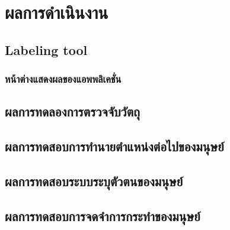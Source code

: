\chapter{ผลการดำเนินงาน}
\section{Labeling tool}
\subsection{หน้าต่างแสดงผลของแอพพลิเคชั่น}


\clearpage
\section{ผลการทดลองการตรวจจับวัตถุ}

\clearpage
\section{ผลการทดสอบการทำนายตำแหน่งต่อไปของมนุษย์}


\section{ผลการทดสอบระบบระบุตัวตนของมนุษย์}


\section{ผลการทดสอบการจดจำการกระทำของมนุษย์}


%

%
